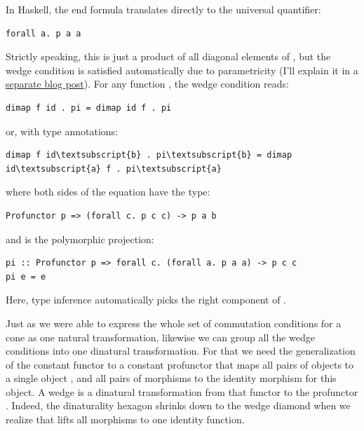 In Haskell, the end formula translates directly to the universal
quantifier:

\begin{Verbatim}[commandchars=\\\{\}]
forall a. p a a
\end{Verbatim}
Strictly speaking, this is just a product of all diagonal elements of
, but the wedge condition is satisfied automatically due to
parametricity (I'll explain it in a
\href{https://bartoszmilewski.com/2017/04/11/profunctor-parametricity/}{separate
blog post}). For any function , the
wedge condition reads:

\begin{Verbatim}[commandchars=\\\{\}]
dimap f id . pi = dimap id f . pi
\end{Verbatim}
or, with type annotations:

\begin{Verbatim}[commandchars=\\\{\}]
dimap f id\textsubscript{b} . pi\textsubscript{b} = dimap id\textsubscript{a} f . pi\textsubscript{a}
\end{Verbatim}
where both sides of the equation have the type:

\begin{Verbatim}[commandchars=\\\{\}]
Profunctor p => (forall c. p c c) -> p a b
\end{Verbatim}
and  is the polymorphic projection:

\begin{Verbatim}[commandchars=\\\{\}]
pi :: Profunctor p => forall c. (forall a. p a a) -> p c c
pi e = e
\end{Verbatim}
Here, type inference automatically picks the right component of
.

Just as we were able to express the whole set of commutation conditions
for a cone as one natural transformation, likewise we can group all the
wedge conditions into one dinatural transformation. For that we need the
generalization of the constant functor  to a constant
profunctor that maps all pairs of objects to a single object ,
and all pairs of morphisms to the identity morphism for this object. A
wedge is a dinatural transformation from that functor to the profunctor
. Indeed, the dinaturality hexagon shrinks down to the wedge
diamond when we realize that  lifts all morphisms to one
identity function.

